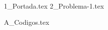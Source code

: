 \documentclass[a4paper,12pt,twoside]{all-in-one} %
\begin{document}

{1_Portada.tex}
{
  \hypersetup{hidelinks}
  \tableofcontents
}
\clearpage
{2_Problema-1.tex}

\clearpage
\appendix
\setcounter{listing}{0}
\renewcommand{\thelisting}{\thesection\arabic{listing}}
\setcounter{table}{0}
\renewcommand{\thetable}{\thesection\arabic{table}}
\setcounter{figure}{0}
\renewcommand{\thefigure}{\thesection\arabic{figure}}
{A_Codigos.tex}

\clearpage
\pagestyle{\auxsettings}
\printbibliography[heading=bibintoc]
\end{document}
